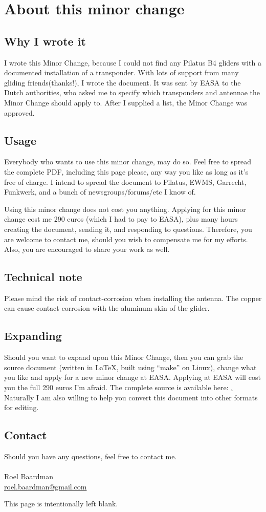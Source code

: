\documentclass{article}
\begin{document}
\section{About this minor change}

\subsection{Why I wrote it}
I wrote this Minor Change, because I could not find any Pilatus B4 gliders with a documented installation of a transponder. With lots of support from many gliding friends(thanks!), I wrote the document. It was sent by EASA to the Dutch authorities, who asked me to specify which transponders and antennae the Minor Change should apply to. After I supplied a list, the Minor Change was approved.

\subsection{Usage}
Everybody who wants to use this minor change, may do so. Feel free to spread the complete PDF, including this page please, any way you like as long as it’s free of charge. I intend to spread the document to Pilatus, EWMS, Garrecht, Funkwerk, and a bunch of newsgroups/forums/etc I know of. 

Using this minor change does not cost you anything. Applying for this minor change cost me 290 euros (which I had to pay to EASA), plus many hours creating the document, sending it, and responding to questions. 
Therefore, you are welcome to contact me, should you wish to compensate me for my efforts. Also, you are encouraged to share your work as well.

\subsection{Technical note}
Please mind the risk of contact-corrosion when installing the antenna. The copper can cause contact-corrosion with the aluminum skin of the glider. 

\subsection{Expanding}
Should you want to expand upon this Minor Change, then you can grab the source document (written in LaTeX, built using “make” on Linux), change what you like and apply for a new minor change at EASA. Applying at EASA will cost you the full 290 euros I’m afraid.
The complete source is available here: \href{https://github.com/roeles/minor_change_transponder}.
Naturally I am also willing to help you convert this document into other formats for editing.

\subsection{Contact}
Should you have any questions, feel free to contact me. \\
\\
Roel Baardman \\
\href{mailto:roel.baardman@gmail.com}{roel.baardman@gmail.com}

\newpage
This page is intentionally left blank.
\end{document}
